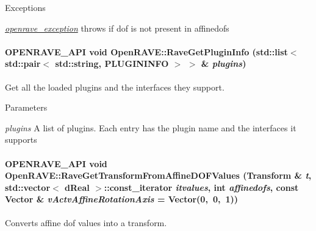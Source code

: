 \begin{DoxyExceptions}{Exceptions}
\item[{\em \hyperlink{classOpenRAVE_1_1openrave__exception}{openrave\_\-exception}}]throws if dof is not present in affinedofs \end{DoxyExceptions}
\hypertarget{namespaceOpenRAVE_a9a5cb560a6ba4ba32d431e1d953dd974}{
\paragraph[{RaveGetPluginInfo}]{\setlength{\rightskip}{0pt plus 5cm}OPENRAVE\_\-API void OpenRAVE::RaveGetPluginInfo (std::list$<$ std::pair$<$ std::string, PLUGININFO $>$ $>$ \& {\em plugins})}\hfill}
\label{namespaceOpenRAVE_a9a5cb560a6ba4ba32d431e1d953dd974}


Get all the loaded plugins and the interfaces they support. 


\begin{DoxyParams}{Parameters}
\item[{\em plugins}]A list of plugins. Each entry has the plugin name and the interfaces it supports \end{DoxyParams}
\hypertarget{namespaceOpenRAVE_a34bfae69aaaf88137c16407df7048aea}{
\paragraph[{RaveGetTransformFromAffineDOFValues}]{\setlength{\rightskip}{0pt plus 5cm}OPENRAVE\_\-API void OpenRAVE::RaveGetTransformFromAffineDOFValues (Transform \& {\em t}, \/  std::vector$<$ dReal $>$::const\_\-iterator {\em itvalues}, \/  int {\em affinedofs}, \/  const Vector \& {\em vActvAffineRotationAxis} = {\ttfamily Vector(0,~0,~1)})}\hfill}
\label{namespaceOpenRAVE_a34bfae69aaaf88137c16407df7048aea}


Converts affine dof values into a transform. 

